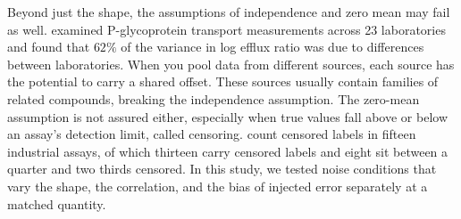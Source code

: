 Beyond just the shape, the assumptions of independence and zero mean may fail as well. \citet{Bentz2013} examined P-glycoprotein transport measurements across 23 laboratories and found that $62\%$ of the variance in log efflux ratio was due to differences between laboratories. When you pool data from different sources, each source has the potential to carry a shared offset. These sources usually contain families of related compounds, breaking the independence assumption. The zero-mean assumption is not assured either, especially when true values fall above or below an assay's detection limit, called censoring. \citet{Svensson2025} count censored labels in fifteen industrial assays, of which thirteen carry censored labels and eight sit between a quarter and two thirds censored. In this study, we tested noise conditions that vary the shape, the correlation, and the bias of injected error separately at a matched quantity.  

